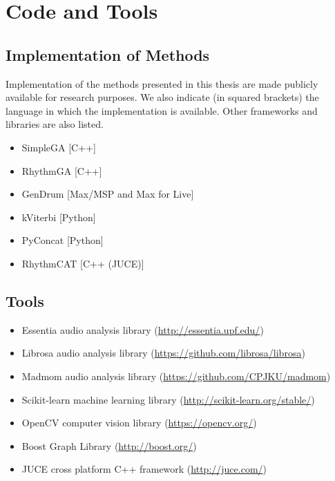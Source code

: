 
\section*{Code and Tools}

\subsection*{Implementation of Methods}
Implementation of the methods presented in this thesis are made publicly available for research purposes. We also indicate (in squared brackets) the language in which the implementation is available. Other frameworks and libraries are also listed.

\begin{itemize}
	\item SimpleGA [C++]
	\item RhythmGA [C++]
	\item GenDrum [Max/MSP and Max for Live]
	\item kViterbi [Python] 
	\item PyConcat [Python]
	\item RhythmCAT [C++ (JUCE)]
\end{itemize}

\subsection*{Tools}

\begin{itemize}
	\item Essentia audio analysis library (\url{http://essentia.upf.edu/})
	\item Librosa audio analysis library (\url{https://github.com/librosa/librosa})
	\item Madmom audio analysis library (\url{https://github.com/CPJKU/madmom})
	\item Scikit-learn machine learning library (\url{http://scikit-learn.org/stable/})
	\item OpenCV computer vision library (\url{https://opencv.org/})
	\item Boost Graph Library (\url{http://boost.org/})
	\item JUCE cross platform C++ framework (\url{http://juce.com/})
\end{itemize}


